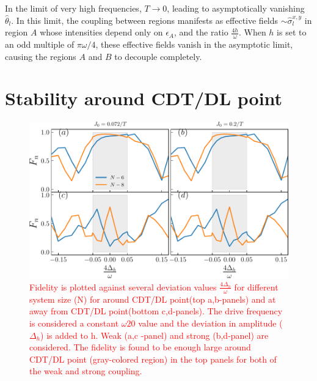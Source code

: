 \documentclass[12pt]{iopart}
\newcommand{\red}[1]{\textcolor{red}{#1}}
\begin{document}
In the limit of very high frequencies, $T\rightarrow 0$, leading to asymptotically vanishing $\hat{\theta}_l$. In this limit, the coupling between regions manifests as effective fields $\sim \hat{\sigma}^{x,y}_l$ in region $A$ whose intensities depend only on $\epsilon_A$, and the ratio $\frac{4h}{\omega}$. When $h$ is set to an odd multiple of $\pi\omega/4$, these effective fields vanish in the asymptotic limit, causing the regions $A$ and $B$ to decouple completely.

\section{\label{sec:AppendixC} Stability around CDT/DL point}
\begin{figure}[t]
	\begin{center}
		\includegraphics[width=12cm]{figure14.pdf}
	\end{center}
	\caption{\red{Fidelity is plotted against several deviation values $\frac{4\Delta_h}{\omega}$ for different system size (N) for around CDT/DL point(top a,b-panels) and at away from CDT/DL point(bottom c,d-panels). The drive frequency is considered a constant $\omega 20$ value and the deviation in amplitude ($\Delta_h$) is added to h. Weak (a,c -panel) and strong (b,d-panel) are considered. The fidelity is found to be enough large around CDT/DL point (gray-colored region) in the top panels for both of the weak and strong coupling.}}
	\label{Fig:aroundCDT}
\end{figure}
\end{document}
